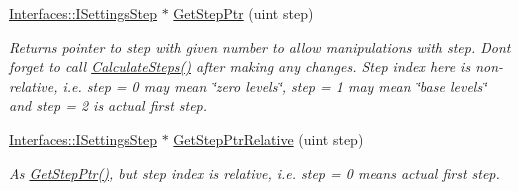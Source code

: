 \begin{DoxyCompactItemize}
\hyperlink{class_interfaces_1_1_i_settings_step}{Interfaces\+::\+I\+Settings\+Step} $\ast$ \hyperlink{class_settings_generator_a37f4175a0ed24853b2f187f15505086b}{Get\+Step\+Ptr} (uint step)
\begin{DoxyCompactList}\small\item\em Returns pointer to step with given number to allow manipulations with step. Don\textquotesingle{}t forget to call \hyperlink{class_settings_generator_a7c9c1a7a3928ba3ce0ad110593b97a96}{Calculate\+Steps()} after making any changes. Step index here is non-\/relative, i.\+e. step = 0 may mean \char`\"{}zero levels\char`\"{}, step = 1 may mean \char`\"{}base levels\char`\"{} and step = 2 is actual first step. \end{DoxyCompactList}\item 
\hyperlink{class_interfaces_1_1_i_settings_step}{Interfaces\+::\+I\+Settings\+Step} $\ast$ \hyperlink{class_settings_generator_aa45d5a3c1349c18ac611ad960ff8470d}{Get\+Step\+Ptr\+Relative} (uint step)
\begin{DoxyCompactList}\small\item\em As \hyperlink{class_settings_generator_a37f4175a0ed24853b2f187f15505086b}{Get\+Step\+Ptr()}, but step index is relative, i.\+e. step = 0 means actual first step. \end{DoxyCompactList}\end{DoxyCompactItemize}
